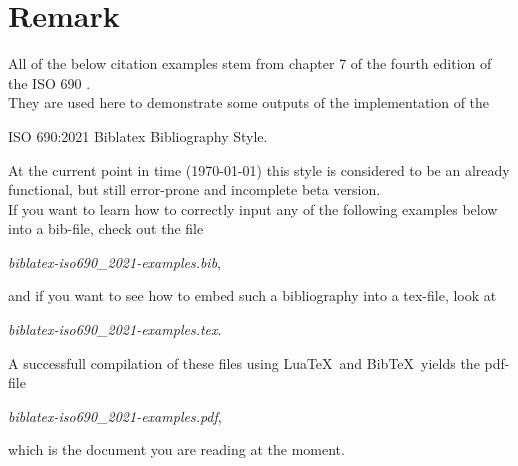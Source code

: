 \documentclass[11pt, a4paper, bibliography=leveldown]{scrreprt}
\begin{document}



\section*{Remark}
All of the below citation examples stem from chapter 7 of the fourth edition
of the ISO 690 \parencite[see][ch.~7]{ISO}.\\
They are used here to demonstrate some outputs of the implementation of the
\begin{center}
\textsf{\Large{ISO 690:2021 Biblatex Bibliography Style.}}
\end{center}
At the current point in time (\today) this style is considered to be an already
functional, but still error-prone and incomplete beta version.\\
If you want to learn how to correctly input any of the following examples
below into a bib-file, check out the file
\begin{center}
\textit{biblatex-iso690\_2021-examples.bib},
\end{center}
and if you want to see how to embed such a bibliography into a tex-file, look at
\begin{center}
\textit{biblatex-iso690\_2021-examples.tex}.
\end{center}
A successfull compilation of these files using Lua\TeX\ and Bib\TeX\ yields
the pdf-file
\begin{center}
\textit{biblatex-iso690\_2021-examples.pdf},
\end{center}
which is the document you are reading at the moment.
\end{document}
